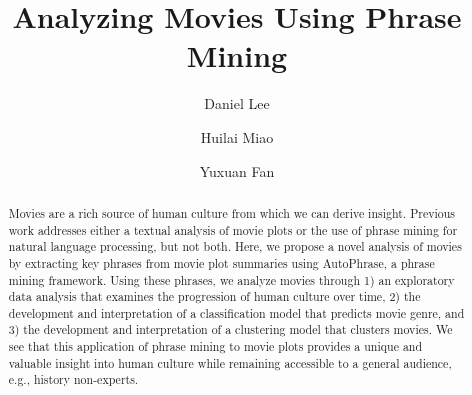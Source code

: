\documentclass{article}
\title{Analyzing Movies Using Phrase Mining}
\author{Daniel Lee \and Huilai Miao \and Yuxuan Fan}
\begin{document}
\maketitle

\begin{abstract} %
Movies are a rich source of human culture from which we can derive insight. Previous work addresses either a textual analysis of movie plots or the use of phrase mining for natural language processing, but not both. Here, we propose a novel analysis of movies by extracting key phrases from movie plot summaries using AutoPhrase, a phrase mining framework. Using these phrases, we analyze movies through 1) an exploratory data analysis that examines the progression of human culture over time, 2) the development and interpretation of a classification model that predicts movie genre, and 3) the development and interpretation of a clustering model that clusters movies. We see that this application of phrase mining to movie plots provides a unique and valuable insight into human culture while remaining accessible to a general audience, e.g., history non-experts.
\end{abstract}
\end{document}
